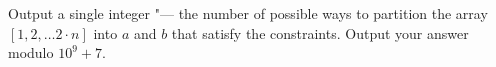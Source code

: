 Output a single integer "--- the number of possible ways to partition the array $[ 1,2, \ldots 2 \cdot n ]$ into $a$ and $b$ that satisfy the constraints. Output your answer modulo $10^9+7$.
